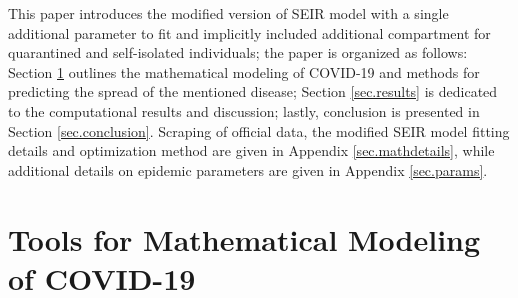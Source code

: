 \documentclass[conference]{IEEEtran}
\begin{document}
This paper introduces the modified version of SEIR model with a single additional parameter to fit and implicitly included additional compartment for quarantined and self-isolated individuals; the paper is organized as follows: Section \ref{sec.modeling} outlines the mathematical modeling of COVID-19 and methods for predicting the spread of the mentioned disease; Section \ref{sec.results} is dedicated to the computational results and discussion; lastly, conclusion is presented in Section \ref{sec.conclusion}. Scraping of official data, the modified SEIR model fitting details and optimization method are given in Appendix \ref{sec.mathdetails}, while additional details on epidemic parameters are given in Appendix \ref{sec.params}. 

\section{Tools for Mathematical Modeling of COVID-19}
\label{sec.modeling}
\end{document}
